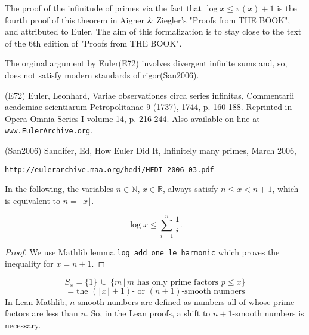 The proof of the infinitude of primes via the fact that $\log x\le \pi(x)+1$ is the fourth proof of this theorem in Aigner \& Ziegler's "Proofs from THE BOOK", and attributed to Euler. The aim of this formalization is to stay close to the text of the 6th edition of "Proofs from THE BOOK".

The orginal argument by Euler(E72) involves divergent infinite sums and, so, does not satisfy
modern standards of rigor(San2006).

(E72)
Euler, Leonhard, Variae observationes circa series infinitas, Commentarii academiae scientiarum
Petropolitanae 9 (1737), 1744, p. 160-188. Reprinted in Opera Omnia Series I volume 14, p. 216-244.
Also available on line at \verb|www.EulerArchive.org|. 

(San2006)
Sandifer, Ed, How Euler Did It, Infinitely many primes, March 2006, \begin{verbatim}http://eulerarchive.maa.org/hedi/HEDI-2006-03.pdf\end{verbatim}

\begin{definition}
\label{def:nx}
In the following, the variables $n\in\mathbb{N}$, $x\in\mathbb{R}$, always satisfy
$n\le x < n+1$, which is equivalent to $n=\lfloor x\rfloor$. 
\end{definition}


\begin{lemma}
\label{lem:lemma0}
\leanok
$$\log x \le \sum_{i=1}^n\frac1i.$$
\end{lemma}
\begin{proof}
\leanok
    We use Mathlib lemma \verb|log_add_one_le_harmonic| which proves the inequality for $x=n+1$. 
\end{proof}

\begin{definition}
\label{def:S}
\leanok
    $$ S_x = \{1\}\ \cup\ \{m\,\big|\, \text{$m$ has only prime factors $p\le x$}\} $$
    $$ = \text{the $(\lfloor x\rfloor +1)$- or $(n+1)$-smooth numbers} $$
In Lean Mathlib, $n$-smooth numbers are defined as numbers all of whose prime factors are less than $n$.
So, in the Lean proofs, a shift to $n+1$-smooth numbers is necessary.
\end{definition}

